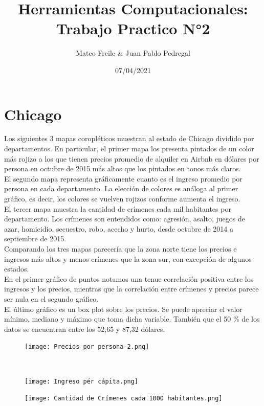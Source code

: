 \documentclass{article}
\title{Herramientas Computacionales: Trabajo Practico N°2}
\author{Mateo Freile & Juan Pablo Pedregal }
\date{07/04/2021}
\begin{document}
\maketitle

\section{Chicago}
Los siguientes 3 mapas  coropléticos muestran al estado de Chicago dividido por departamentos. En particular, el primer mapa los presenta pintados de un color más rojizo a los que tienen precios promedio de alquiler en Airbnb en dólares por persona en octubre de 2015 más altos que los pintados en tonos más claros.\\
El segundo mapa representa gráficamente cuanto es el ingreso promedio por persona en cada departamento. La elección de colores es análoga al primer gráfico, es decir, los colores se vuelven rojizos conforme aumenta el ingreso.\\
El tercer mapa muestra la cantidad de crímenes cada mil habitantes por departamento. Los crímenes son entendidos como: agresión, asalto, juegos de azar, homicidio, secuestro, robo, acecho y hurto, desde octubre de 2014 a septiembre de 2015.\\
Comparando los tres mapas parecería que la zona norte tiene los precios e ingresos más altos y menos crímenes que la zona sur, con excepción de algunos estados.\\
En el primer gráfico de puntos notamos una tenue correlación positiva entre los ingresos y los precios, mientras que la correlación entre crímenes y precios parece ser nula en el segundo gráfico.\\
El último gráfico es un box plot sobre los precios. Se puede apreciar el valor mínimo, mediano y máximo que toma dicha variable. También que el 50 \% de los datos se encuentran entre los 52,65 y 87,32 dólares.

\begin{figure}[htbp]
\centerline{\texttt{[image: Precios por persona-2.png]}}
\caption{}
\label{fig}
\end{figure}\\


\begin{figure}[htbp]
\centerline{\texttt{[image: Ingreso pér cápita.png]}}
\caption{}
\label{fig}
\end{figure}

\begin{figure}[htbp]
\centerline{\texttt{[image: Cantidad de Crímenes cada 1000 habitantes.png]}}
\caption{}
\label{fig}
\end{figure}
\end{document}
